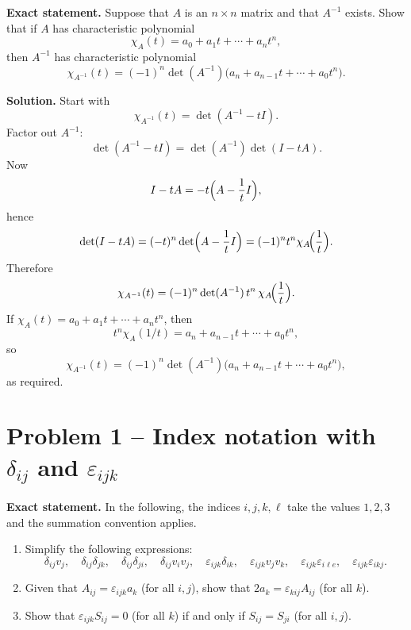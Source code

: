 \documentclass[12pt,a4paper]{article}
\theoremstyle{plain}
\theoremstyle{definition}      %
\begin{document}
\textbf{Exact statement.}
Suppose that \(A\) is an \(n\times n\) matrix and that \(A^{-1}\) exists. Show that if \(A\) has characteristic polynomial
\[
\chi_A(t)=a_0+a_1 t+\cdots+a_n t^n,
\]
then \(A^{-1}\) has characteristic polynomial
\[
\chi_{A^{-1}}(t)=(-1)^n\det(A^{-1})\bigl(a_n+a_{n-1}t+\cdots+a_0 t^n\bigr).
\]

\textbf{Solution.}
Start with
\[
\chi_{A^{-1}}(t)=\det(A^{-1}-tI).
\]
Factor out \(A^{-1}\):
\[
\det(A^{-1}-tI)=\det(A^{-1})\det(I-tA).
\]
Now
\[
I-tA=-t\Bigl(A-\frac{1}{t}I\Bigr),
\]
hence
\[
\det(I-tA)=(-t)^n\det\Bigl(A-\frac{1}{t}I\Bigr)=(-1)^n t^n \chi_A\!\Bigl(\frac{1}{t}\Bigr).
\]
Therefore
\[
\chi_{A^{-1}}(t)=(-1)^n\det(A^{-1})\,t^n\,\chi_A\!\Bigl(\frac{1}{t}\Bigr).
\]
If \(\chi_A(t)=a_0+a_1 t+\cdots+a_n t^n\), then
\[
t^n\chi_A(1/t)=a_n+a_{n-1}t+\cdots+a_0 t^n,
\]
so
\[
\chi_{A^{-1}}(t)=(-1)^n\det(A^{-1})\bigl(a_n+a_{n-1}t+\cdots+a_0 t^n\bigr),
\]
as required.

\section*{Problem 1 -- Index notation with $\delta_{ij}$ and $\varepsilon_{ijk}$}

\textbf{Exact statement.}
In the following, the indices $i,j,k,\ell$ take the values $1,2,3$ and the summation convention applies.
\begin{enumerate}[label=(\alph*)]
	\item Simplify the following expressions:
	\[
	\delta_{ij}v_j,\quad \delta_{ij}\delta_{jk},\quad \delta_{ij}\delta_{ji},\quad \delta_{ij}v_iv_j,\quad
	\varepsilon_{ijk}\delta_{ik},\quad \varepsilon_{ijk}v_jv_k,\quad
	\varepsilon_{ijk}\varepsilon_{i\ell e},\quad \varepsilon_{ijk}\varepsilon_{ikj}.
	\]
	\item Given that $A_{ij}=\varepsilon_{ijk}a_k$ (for all $i,j$), show that $2a_k=\varepsilon_{kij}A_{ij}$ (for all $k$).
	\item Show that $\varepsilon_{ijk}S_{ij}=0$ (for all $k$) if and only if $S_{ij}=S_{ji}$ (for all $i,j$).
\end{enumerate}
\end{document}
